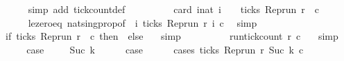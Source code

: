 \begin{isabellebody}
\ \ \ \ \ \ \isamarkupfalse%
\ {\isacharparenleft}simp\ add{\isacharcolon}\ tick{\isacharunderscore}count{\isacharunderscore}def{\isacharparenright}\isanewline
\ \ \ \ \isamarkupfalse%
\ \isamarkupfalse%
\ {\isacartoucheopen}{\isachardot}{\isachardot}{\isachardot}\ {\isacharequal}\ card\ {\isacharbraceleft}i{\isacharcolon}{\isacharcolon}nat{\isachardot}\ i\ {\isacharequal}\ {}\ {\isasymand}\ ticks\ {\isacharparenleft}{\isacharparenleft}Rep{\isacharunderscore}run\ r{\isacharparenright}\ {}\ c{\isacharparenright}{\isacharbraceright}{\isacartoucheclose}\isanewline
\ \ \ \ \ \ \isamarkupfalse%
\ le{\isacharunderscore}zero{\isacharunderscore}eq\ nat{\isacharunderscore}sing{\isacharunderscore}prop{\isacharbrackleft}of\ {\isacartoucheopen}{}{\isacartoucheclose}\ {\isacartoucheopen}{\isasymlambda}i{\isachardot}\ ticks\ {\isacharparenleft}{\isacharparenleft}Rep{\isacharunderscore}run\ r{\isacharparenright}\ i\ c{\isacharparenright}{\isacartoucheclose}{\isacharbrackright}\ \isamarkupfalse%
\ simp\isanewline
\ \ \ \ \isamarkupfalse%
\ \isamarkupfalse%
\ {\isacartoucheopen}{\isachardot}{\isachardot}{\isachardot}\ {\isacharequal}\ {\isacharparenleft}if\ ticks\ {\isacharparenleft}{\isacharparenleft}Rep{\isacharunderscore}run\ r{\isacharparenright}\ {}\ c{\isacharparenright}\ then\ {}\ else\ {}{\isacharparenright}{\isacartoucheclose}\ \isamarkupfalse%
\ simp\isanewline
\ \ \ \ \isamarkupfalse%
\ \isamarkupfalse%
\ {\isacartoucheopen}{\isachardot}{\isachardot}{\isachardot}\ {\isacharequal}\ run{\isacharunderscore}tick{\isacharunderscore}count\ r\ c\ {}{\isacartoucheclose}\ \isamarkupfalse%
\ simp\isanewline
\ \ \ \ \isamarkupfalse%
\ \isamarkupfalse%
\ {\isacharquery}case\ \isacommand{{\isachardot}}\isamarkupfalse%
\isanewline
{}\isamarkupfalse%
\isanewline
\ \ \isamarkupfalse%
\ {\isacharparenleft}Suc\ k{\isacharparenright}\isanewline
\ \ \ \ \isamarkupfalse%
\ {\isacharquery}case\isanewline
\ \ \ \ \isamarkupfalse%
\ {\isacharparenleft}cases\ {\isacartoucheopen}ticks\ {\isacharparenleft}{\isacharparenleft}Rep{\isacharunderscore}run\ r{\isacharparenright}\ {\isacharparenleft}Suc\ k{\isacharparenright}\ c{\isacharparenright}{\isacartoucheclose}{\isacharparenright}\isanewline
\ \ \ \ \ \ \isamarkupfalse%

\end{isabellebody}
